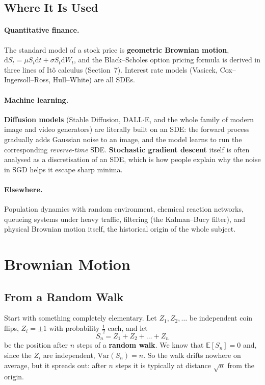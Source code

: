 \documentclass[]{article}
\newcommand{\E}{\mathbb{E}}
\newcommand{\Var}{\mathrm{Var}}
\newcommand{\Ito}{It\^{o}}
\newcommand{\dd}{\mathrm{d}}
\begin{document}
	\subsection{Where It Is Used}

	\paragraph{Quantitative finance.}
	The standard model of a stock price is \textbf{geometric Brownian motion}, $\dd S_t = \mu S_t \dd t + \sigma S_t \dd W_t$, and the Black--Scholes option pricing formula is derived in three lines of \Ito{} calculus (Section~7).
	Interest rate models (Vasicek, Cox--Ingersoll--Ross, Hull--White) are all SDEs.

	\paragraph{Machine learning.}
	\textbf{Diffusion models} (Stable Diffusion, DALL$\cdot$E, and the whole family of modern image and video generators) are literally built on an SDE: the forward process gradually adds Gaussian noise to an image, and the model learns to run the corresponding \textit{reverse-time} SDE.
	\textbf{Stochastic gradient descent} itself is often analysed as a discretisation of an SDE, which is how people explain why the noise in SGD helps it escape sharp minima.

	\paragraph{Elsewhere.}
	Population dynamics with random environment, chemical reaction networks, queueing systems under heavy traffic, filtering (the Kalman--Bucy filter), and physical Brownian motion itself, the historical origin of the whole subject.

	\section{Brownian Motion}

	\subsection{From a Random Walk}

	Start with something completely elementary.
	Let $Z_1, Z_2, \dots$ be independent coin flips, $Z_i = \pm 1$ with probability $\frac12$ each, and let
	$$
	S_n = Z_1 + Z_2 + \dots + Z_n
	$$
	be the position after $n$ steps of a \textbf{random walk}.
	We know that $\E[S_n] = 0$ and, since the $Z_i$ are independent, $\Var(S_n) = n$.
	So the walk drifts nowhere on average, but it spreads out: after $n$ steps it is typically at distance $\sqrt{n}$ from the origin.
\end{document}
